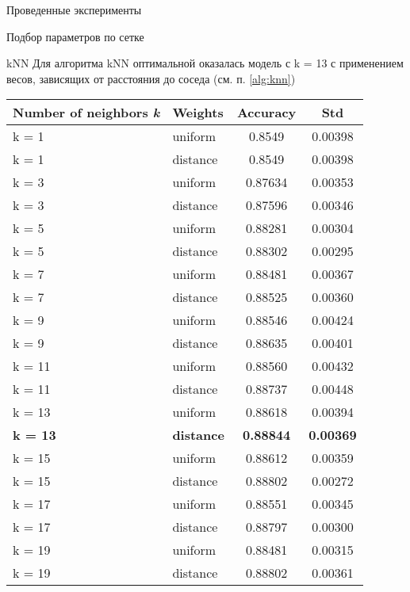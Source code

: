 

\begin{section}{Проведенные эксперименты}

\begin{subsection}{Подбор параметров по сетке}
\begin{subsubsection}{kNN}
  Для алгоритма kNN оптимальной оказалась модель с k = 13 с применением весов, зависящих от расстояния до соседа (см. п. \ref{alg:knn})

  \begin{table}[H]
  \centering
  {\begin{tabular}{|l|l|c|c|}
  \hline
  \textbf{Number of neighbors \textit{k}} & \textbf{Weights} & \textbf{Accuracy} & \textbf{Std} \\
  \hline
  k = 1 & uniform  & 0.8549 & 0.00398 \\
  \hline
  k = 1 & distance  & 0.8549 & 0.00398 \\
  \hline
  k = 3 & uniform  & 0.87634 & 0.00353 \\
  \hline
  k = 3 &  distance & 0.87596  & 0.00346 \\
  \hline
  k = 5 & uniform  & 0.88281 & 0.00304 \\
  \hline
  k = 5 & distance  & 0.88302 & 0.00295 \\
  \hline
  k = 7 & uniform  & 0.88481 & 0.00367 \\
  \hline
  k = 7 &  distance & 0.88525  & 0.00360 \\
  \hline
  k = 9 & uniform  & 0.88546 & 0.00424 \\
  \hline
  k = 9 & distance  & 0.88635 & 0.00401 \\
  \hline
  k = 11 & uniform  & 0.88560 & 0.00432 \\
  \hline
  k = 11 &  distance & 0.88737  & 0.00448 \\
  \hline
  k = 13 & uniform  & 0.88618 &  0.00394 \\
  \hline
  \textbf{k = 13} & \textbf{distance}  & \textbf{0.88844} & \textbf{0.00369} \\
  \hline
  k = 15 & uniform  & 0.88612 & 0.00359 \\
  \hline
  k = 15 &  distance & 0.88802  & 0.00272 \\
  \hline
  k = 17 & uniform  & 0.88551 & 0.00345 \\
  \hline
  k = 17 & distance  & 0.88797 & 0.00300 \\
  \hline
  k = 19 & uniform  & 0.88481 & 0.00315 \\
  \hline
  k = 19 &  distance & 0.88802  & 0.00361 \\
  \hline
  \end{tabular}}


\end{table}
\end{subsubsection}
\end{subsection}
\end{section}
